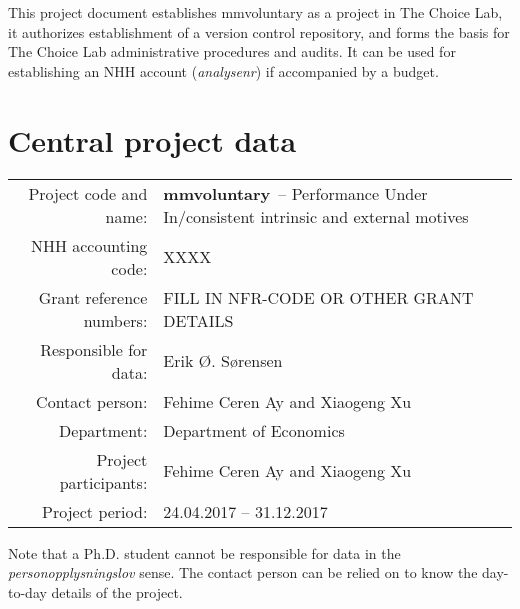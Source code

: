 \documentclass[a4paper,10pt]{article}
\begin{document}
\newcommand{\PROJECT}{\textbf{mmvoluntary}}
\sloppy


\begin{small} \noindent This project document establishes mmvoluntary as a
project in The Choice Lab,  it authorizes establishment of a version control
repository, and forms the basis for The Choice Lab administrative procedures and
audits. It can be used for establishing an NHH account (\emph{analysenr}) if accompanied by a
budget. 
\end{small}


\section*{Central project data}


\begin{tabular}{rp{10cm}}
Project code and name:   &   \PROJECT\  -- Performance Under In/consistent intrinsic and external motives \\
NHH accounting code:     & XXXX \\
Grant reference numbers: & FILL IN NFR-CODE OR OTHER GRANT DETAILS \\
Responsible for data: & Erik {\O}. S{\o}rensen \\
Contact person:       & Fehime Ceren Ay and Xiaogeng Xu \\
Department:            & Department of Economics              \\
Project participants:    & Fehime Ceren Ay and Xiaogeng Xu \\
Project period:          & 24.04.2017 -- 31.12.2017 \\
\end{tabular}


\medskip
\begin{small}
  \noindent Note that a Ph.D. student cannot be responsible for data
  in the \emph{personopplysningslov} sense. The contact person can be
  relied on to know the day-to-day details of the project.
\end{small}



\end{document}
